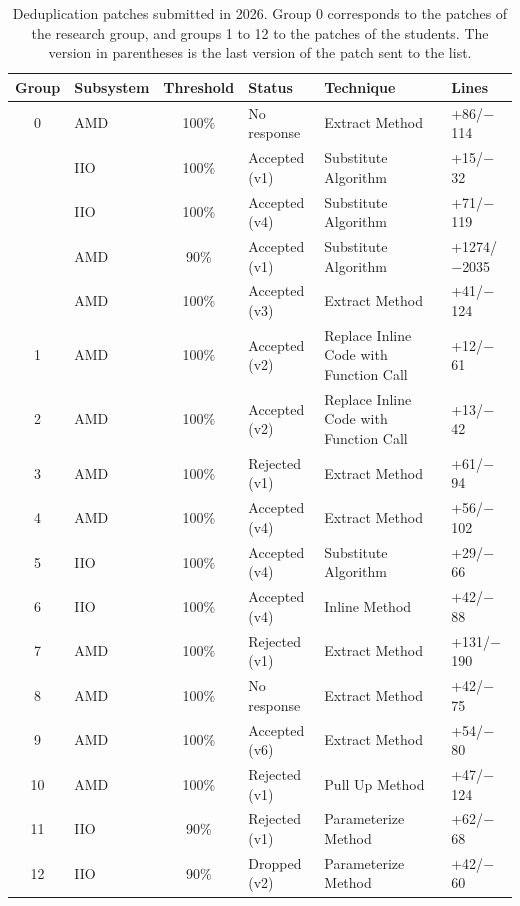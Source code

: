 \begin{table}[htbp]
    \centering
    \small
    \caption{Deduplication patches submitted in 2026. Group 0 corresponds to the patches of the research group, and groups 1 to 12 to the patches of the students. The version in parentheses is the last version of the patch sent to the list.}
    \label{tab:results-patches}
    \begin{tabular}{clclll}
        \hline
        Group & Subsystem & Threshold & Status & Technique & Lines \\
        \hline
        0  & AMD & 100\% & No response   & Extract Method                          & +86/$-$114 \\
           & IIO & 100\% & Accepted (v1) & Substitute Algorithm                    & +15/$-$32 \\
           & IIO & 100\% & Accepted (v4) & Substitute Algorithm                    & +71/$-$119 \\
           & AMD & 90\%  & Accepted (v1) & Substitute Algorithm                    & +1274/$-$2035 \\
           & AMD & 100\% & Accepted (v3) & Extract Method                          & +41/$-$124 \\
        1  & AMD & 100\% & Accepted (v2) & Replace Inline Code with Function Call  & +12/$-$61 \\
        2  & AMD & 100\% & Accepted (v2) & Replace Inline Code with Function Call  & +13/$-$42 \\
        3  & AMD & 100\% & Rejected (v1) & Extract Method                          & +61/$-$94 \\
        4  & AMD & 100\% & Accepted (v4) & Extract Method                          & +56/$-$102 \\
        5  & IIO & 100\% & Accepted (v4) & Substitute Algorithm                    & +29/$-$66 \\
        6  & IIO & 100\% & Accepted (v4) & Inline Method                           & +42/$-$88 \\
        7  & AMD & 100\% & Rejected (v1) & Extract Method                          & +131/$-$190 \\
        8  & AMD & 100\% & No response   & Extract Method                          & +42/$-$75 \\
        9  & AMD & 100\% & Accepted (v6) & Extract Method                          & +54/$-$80 \\
        10 & AMD & 100\% & Rejected (v1) & Pull Up Method                          & +47/$-$124 \\
        11 & IIO & 90\%  & Rejected (v1) & Parameterize Method                     & +62/$-$68 \\
        12 & IIO & 90\%  & Dropped (v2)  & Parameterize Method                     & +42/$-$60 \\
        \hline
    \end{tabular}
\end{table}

